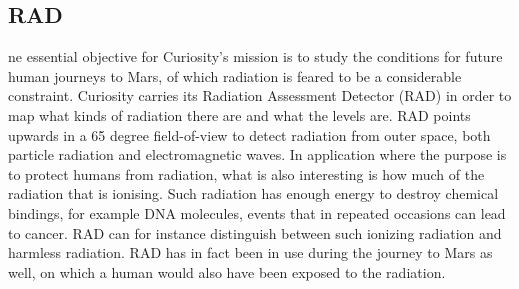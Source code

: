 \subsection{RAD}
ne essential objective for Curiosity's mission is to study the conditions for future human journeys to Mars, of which radiation is feared to be a considerable constraint.
Curiosity carries its Radiation Assessment Detector (RAD) in order to map what kinds of radiation there are and what the levels are.
RAD points upwards in a 65 degree field-of-view to detect radiation from outer space, both particle radiation and electromagnetic waves.
In application where the purpose is to protect humans from radiation, what is also interesting is how much of the radiation that is ionising.
Such radiation has enough energy to destroy chemical bindings, for example DNA molecules, events that in repeated occasions can lead to cancer.
RAD can for instance distinguish between such ionizing radiation and harmless radiation.
RAD has in fact been in use during the journey to Mars as well, on which a human would also have been exposed to the radiation. \cite{RAD}